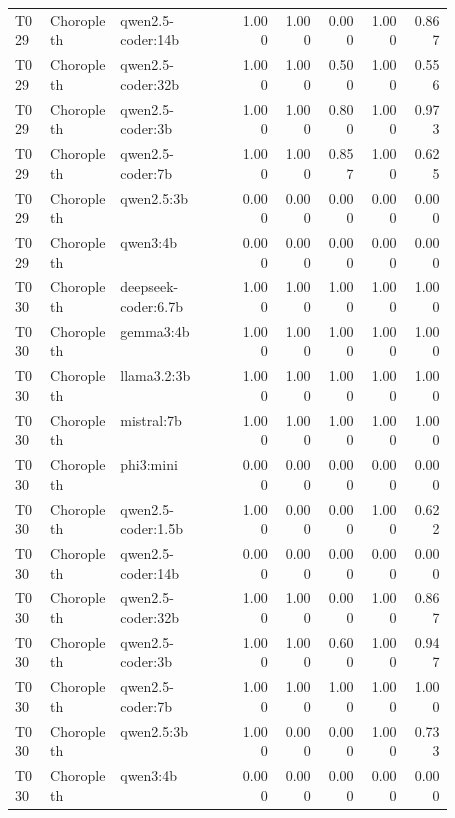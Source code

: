 \begin{longtable}{p{0.08\linewidth}p{0.16\linewidth}p{0.27\linewidth}rrrrr}
T029 & Choropleth & qwen2.5-coder:14b & 1.000 & 1.000 & 0.000 & 1.000 & 0.867 \\
T029 & Choropleth & qwen2.5-coder:32b & 1.000 & 1.000 & 0.500 & 1.000 & 0.556 \\
T029 & Choropleth & qwen2.5-coder:3b & 1.000 & 1.000 & 0.800 & 1.000 & 0.973 \\
T029 & Choropleth & qwen2.5-coder:7b & 1.000 & 1.000 & 0.857 & 1.000 & 0.625 \\
T029 & Choropleth & qwen2.5:3b & 0.000 & 0.000 & 0.000 & 0.000 & 0.000 \\
T029 & Choropleth & qwen3:4b & 0.000 & 0.000 & 0.000 & 0.000 & 0.000 \\
T030 & Choropleth & deepseek-coder:6.7b & 1.000 & 1.000 & 1.000 & 1.000 & 1.000 \\
T030 & Choropleth & gemma3:4b & 1.000 & 1.000 & 1.000 & 1.000 & 1.000 \\
T030 & Choropleth & llama3.2:3b & 1.000 & 1.000 & 1.000 & 1.000 & 1.000 \\
T030 & Choropleth & mistral:7b & 1.000 & 1.000 & 1.000 & 1.000 & 1.000 \\
T030 & Choropleth & phi3:mini & 0.000 & 0.000 & 0.000 & 0.000 & 0.000 \\
T030 & Choropleth & qwen2.5-coder:1.5b & 1.000 & 0.000 & 0.000 & 1.000 & 0.622 \\
T030 & Choropleth & qwen2.5-coder:14b & 0.000 & 0.000 & 0.000 & 0.000 & 0.000 \\
T030 & Choropleth & qwen2.5-coder:32b & 1.000 & 1.000 & 0.000 & 1.000 & 0.867 \\
T030 & Choropleth & qwen2.5-coder:3b & 1.000 & 1.000 & 0.600 & 1.000 & 0.947 \\
T030 & Choropleth & qwen2.5-coder:7b & 1.000 & 1.000 & 1.000 & 1.000 & 1.000 \\
T030 & Choropleth & qwen2.5:3b & 1.000 & 0.000 & 0.000 & 1.000 & 0.733 \\
T030 & Choropleth & qwen3:4b & 0.000 & 0.000 & 0.000 & 0.000 & 0.000 \\
\bottomrule
\end{longtable}
\normalsize
